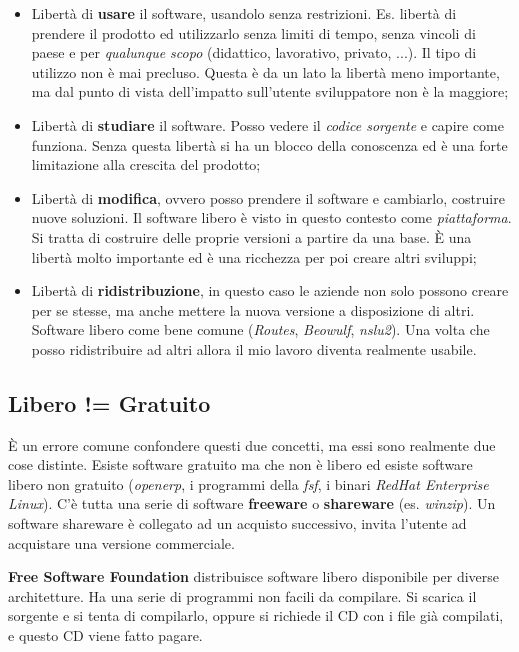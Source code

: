 \begin{itemize}

\item Libertà di \textbf{usare} il software, usandolo senza restrizioni. Es. libertà di prendere il prodotto ed utilizzarlo senza limiti di tempo, senza vincoli di paese e per \textit{qualunque scopo} (didattico, lavorativo, privato, ...). Il tipo di utilizzo non è mai precluso. Questa è da un lato la libertà meno importante, ma dal punto di vista dell'impatto sull'utente sviluppatore non è la maggiore;
\item Libertà di \textbf{studiare} il software. Posso vedere il \textit{codice sorgente} e capire come funziona. Senza questa libertà si ha un blocco della conoscenza ed è una forte limitazione alla crescita del prodotto;
\item Libertà di \textbf{modifica}, ovvero posso prendere il software e cambiarlo, costruire nuove soluzioni. Il software libero è visto in questo contesto come \textit{piattaforma}. Si tratta di costruire delle proprie versioni a partire da una base. È una libertà molto importante ed è una ricchezza per poi creare altri sviluppi;
\item Libertà di \textbf{ridistribuzione}, in questo caso le aziende non solo possono creare per se stesse, ma anche mettere la nuova versione a disposizione di altri. Software libero come bene comune (\textit{Routes}, \textit{Beowulf}, \textit{nslu2}). Una volta che posso ridistribuire ad altri allora il mio lavoro diventa realmente usabile. 

\end{itemize}

\subsection{Libero != Gratuito}

È un errore comune confondere questi due concetti, ma essi sono realmente due cose distinte. Esiste software gratuito ma che non è libero ed esiste software libero non gratuito (\textit{openerp}, i programmi della \textit{fsf}, i binari \textit{RedHat Enterprise Linux}). C'è tutta una serie di software \textbf{freeware} o \textbf{shareware} (es. \textit{winzip}). Un software shareware è collegato ad un acquisto successivo, invita l'utente ad acquistare una versione commerciale.

\textbf{Free Software Foundation} distribuisce software libero disponibile per diverse architetture. Ha una serie di programmi non facili da compilare. Si scarica il sorgente e si tenta di compilarlo, oppure si richiede il CD con i file già compilati, e questo CD viene fatto pagare.

